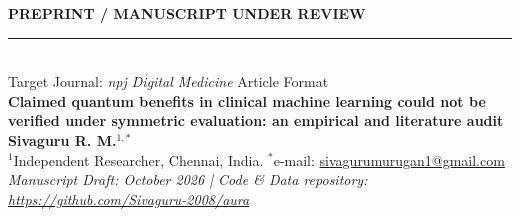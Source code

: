\documentclass[10pt,a4paper,twoside]{article}
\begin{document}
\thispagestyle{firstpage}

 \hfill {\large\textbf{\textsf{PREPRINT / MANUSCRIPT UNDER REVIEW}}}\\[2pt]
\rule{\textwidth}{1.2pt}\\[3pt]
{\footnotesize\textsf{Target Journal: \textit{npj Digital Medicine}}} \hfill {\footnotesize\textsf{\color{naturegray}Article Format}}\\[14pt]

{\LARGE\textbf{\textsf{Claimed quantum benefits in clinical machine learning could not be verified under symmetric evaluation: an empirical and literature audit}}}\\[12pt]

{\large\textbf{\textsf{Sivaguru R. M.}}$^{1,*}$}\\[6pt]

{\footnotesize $^{1}$Independent Researcher, Chennai, India. $^*$e-mail: \href{mailto:sivagurumurugan1@gmail.com}{sivagurumurugan1@gmail.com}}\\[4pt]
{\footnotesize\textit{Manuscript Draft: October 2026 | Code \& Data repository: \url{https://github.com/Sivaguru-2008/aura}}}\\[10pt]
\end{document}

